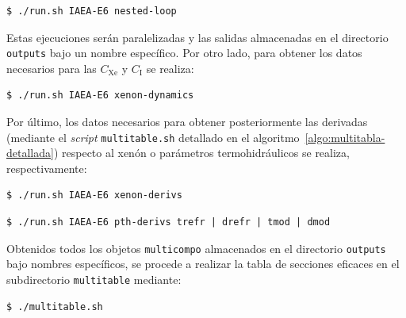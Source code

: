 \documentclass[11pt]{article}
\begin{document}
\begin{lstlisting}[style=bash_tecna]
$ ./run.sh IAEA-E6 nested-loop
\end{lstlisting}

\noindent
Estas ejecuciones serán paralelizadas y las salidas almacenadas en el directorio \texttt{outputs} bajo un nombre específico. Por otro lado, para obtener los datos necesarios para las $C_{\text{Xe}}$ y $C_{\text{I}}$ se realiza:

\begin{lstlisting}[style=bash_tecna]
$ ./run.sh IAEA-E6 xenon-dynamics
\end{lstlisting}

Por último, los datos necesarios para obtener posteriormente las derivadas (mediante el \emph{script} \texttt{multitable.sh} detallado en el algoritmo~\ref{algo:multitabla-detallada}) respecto al xenón o parámetros termohidráulicos se realiza, respectivamente:

\begin{lstlisting}[style=bash_tecna]
$ ./run.sh IAEA-E6 xenon-derivs
\end{lstlisting}

\begin{lstlisting}[style=bash_tecna]
$ ./run.sh IAEA-E6 pth-derivs trefr | drefr | tmod | dmod
\end{lstlisting}

Obtenidos todos los objetos \texttt{multicompo} almacenados en el directorio \texttt{outputs} bajo nombres específicos, se procede a realizar la tabla de secciones eficaces en el subdirectorio \texttt{multitable} mediante:

\begin{lstlisting}[style=bash_tecna]
$ ./multitable.sh
\end{lstlisting}
\end{document}
